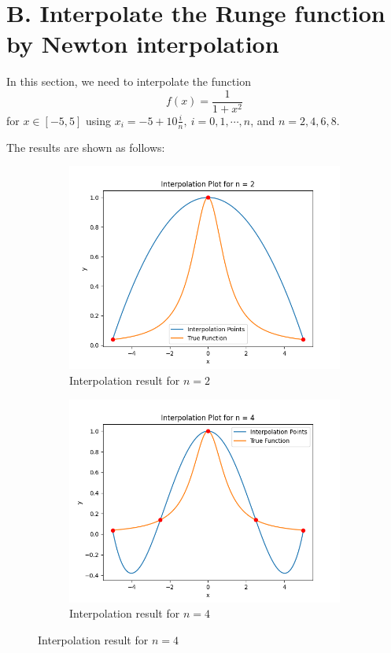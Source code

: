 \documentclass[a4paper]{article}
\begin{document}
\section*{B. Interpolate the Runge function by Newton interpolation}

In this section, we need to interpolate the function 
\begin{equation}
    f(x) = \frac{1}{1 + x^2}
    \label{eq:B.runge}
\end{equation}
for $x \in [-5, 5]$ using $x_i = -5 + 10\frac{i}{n},\ i = 0, 1, \cdots, n$, and $n = 2, 4, 6, 8$.

The results are shown as follows:

\begin{figure}[htbp]
    \centering
    \begin{subfigure}[b]{0.48\textwidth}
        \includegraphics[width=\textwidth]{../results/Task_B/Interpolation_Plot_n_2.png}
        \caption{Interpolation result for $n = 2$}
    \end{subfigure}
    \hfill
    \begin{subfigure}[b]{0.48\textwidth}
        \includegraphics[width=\textwidth]{../results/Task_B/Interpolation_Plot_n_4.png}
        \caption{Interpolation result for $n = 4$}
    \end{subfigure}


\end{figure}
\end{document}
